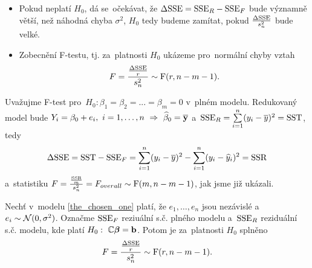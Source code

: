 \begin{itemize}
	\item Pokud neplatí $H_0$, dá se~očekávat, že $\Delta\mathrm{SSE} = \mathrm{SSE}_R-\mathrm{SSE}_F$ bude významně větší, než náhodná chyba $\sigma^2$, $H_0$ tedy budeme zamítat, pokud $\frac{\Delta\mathrm{SSE}}{s_n^2}$ bude velké.
	\item Zobecnění F-testu, tj. za~platnosti $H_0$ ukázeme pro~normální chyby vztah
	 $$ F = \frac{\frac{\Delta\mathrm{SSE}}{r}}{s_n^2}\sim\mathrm{F}(r,n-m-1). $$
\end{itemize}
\begin{example}
	Uvažujme F-test pro~$H_0:\beta_1 = \beta_2 = ... = \beta_m = 0$ v~plném modelu. Redukovaný model bude $Y_i = \beta_0+e_i,~i = 1,\dots,n~\Rightarrow~\widehat{\beta}_0 = \overline{\mathbf{y}}$ a~$\mathrm{SSE}_R = \sum\limits_{i=1}^{n} (y_i-\overline{y})^2 = \mathrm{SST}$, tedy
	 $$ \Delta \mathrm{SSE} = \mathrm{SST}-\mathrm{SSE}_F = \sum\limits_{i=1}^{n} (y_i-\overline{y})^2-\sum\limits_{i=1}^{n} (y_i-\widehat{y}_i)^2 = \mathrm{SSR} $$
	 a~statistiku $F = \frac{\frac{\mathrm{SSR}}{m}}{s_n^2} = F_{overall}\sim\mathrm{F}(m,n-m-1)$, jak jsme již ukázali.
\end{example}
\begin{theorem}
	Nechť v~modelu \eqref{the_chosen_one} platí, že $e_1,\dots,e_n$ jsou nezávislé a~$e_i\sim\mathcal{N}(0,\sigma^2)$. Označme $\mathrm{SSE}_F$ reziuální s.č. plného modelu a~$\mathrm{SSE}_R$ reziduální s.č. modelu, kde platí $H_0:~\mathbb{C}\boldsymbol{\beta} = \textbf{b}$. Potom je za~platnosti $H_0$ splněno
	 $$ F = \frac{\frac{\Delta\mathrm{SSE}}{r}}{s_n^2}\sim\mathrm{F}(r,n-m-1). $$
\end{theorem}
